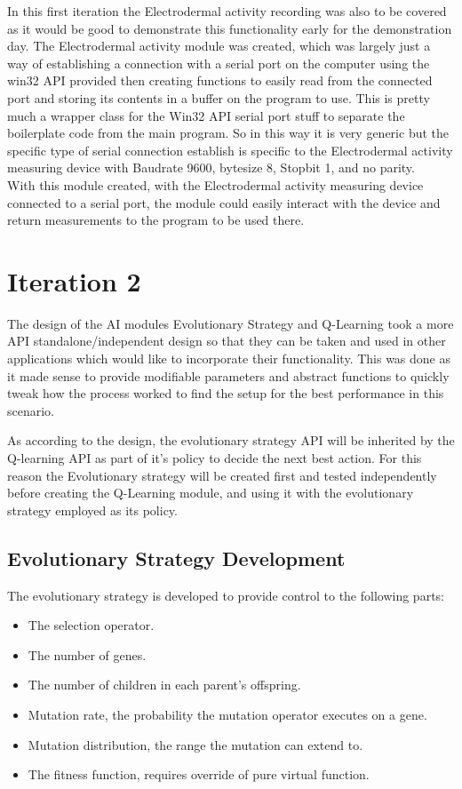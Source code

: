 \documentclass{report}
\begin{document}
In this first iteration the Electrodermal activity recording was also to be covered as it would be good to demonstrate this functionality early for the demonstration
day. The Electrodermal activity module was created, which was largely just a way of establishing a connection with a serial port on the computer using the win32 API provided
then creating functions to easily read from the connected port and storing its contents in a buffer on the program to use. This is pretty much a wrapper class for the
Win32 API serial port stuff to separate the boilerplate code from the main program. So in this way it is very generic but the specific type of serial connection
establish is specific to the Electrodermal activity measuring device with Baudrate 9600, bytesize 8, Stopbit 1, and no parity.\\
With this module created, with the Electrodermal activity measuring device connected to a serial port, the module could easily interact with the device and
return measurements to the program to be used there.

\section{Iteration 2}

The design of the AI modules Evolutionary Strategy and Q-Learning took a more API standalone/independent design so that they can be taken and used in other applications which would
like to incorporate their functionality. This was done as it made sense to provide modifiable parameters and abstract functions to quickly tweak how the process
worked to find the setup for the best performance in this scenario.

As according to the design, the evolutionary strategy API will be inherited by the Q-learning API as part of it's policy to decide the next best action. 
For this reason the Evolutionary strategy will be created first and tested independently before creating the Q-Learning module, and using it with
the evolutionary strategy employed as its policy.

\subsection{Evolutionary Strategy Development}

The evolutionary strategy is developed to provide control to the following parts:\\
\begin{itemize}
	\item The selection operator.
	\item The number of genes.
	\item The number of children in each parent's offspring.
	\item Mutation rate, the probability the mutation operator executes on a gene.
	\item Mutation distribution, the range the mutation can extend to.
	\item The fitness function, requires override of pure virtual function.
\end{itemize}
\end{document}
